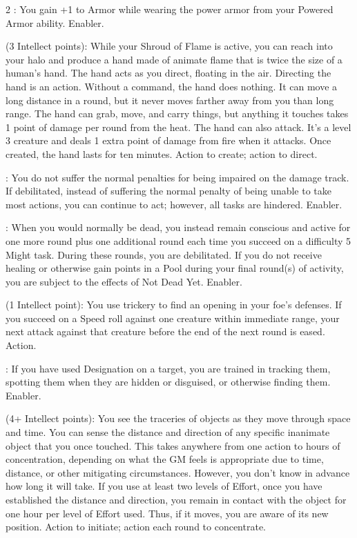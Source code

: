\begin{multicols}{2}
: You gain +1 to Armor while wearing the power armor from your Powered Armor ability. Enabler. 
 
 (3 Intellect points): While your Shroud of Flame is active, you can reach into your halo and produce a hand made of animate flame that is twice the size of a human’s hand. The hand acts as you direct, floating in the air. Directing the hand is an action. Without a command, the hand does nothing. It can move a long distance in a round, but it never moves farther away from you than long range. The hand can grab, move, and carry things, but anything it touches takes 1 point of damage per round from the heat. The hand can also attack. It’s a level 3 creature and deals 1 extra point of damage from fire when it attacks. Once created, the hand lasts for ten minutes. Action to create; action to direct. 
 
: You do not suffer the normal penalties for being impaired on the damage track. If debilitated, instead of suffering the normal penalty of being unable to take most actions, you can continue to act; however, all tasks are hindered. Enabler.
 
: When you would normally be dead, you instead remain conscious and active for one more round plus one additional round each time you succeed on a difficulty 5 Might task. During these rounds, you are debilitated. If you do not receive healing or otherwise gain points in a Pool during your final round(s) of activity, you are subject to the effects of Not Dead Yet. Enabler.
 
 (1 Intellect point): You use trickery to find an opening in your foe’s defenses. If you succeed on a Speed roll against one creature within immediate range, your next attack against that creature before the end of the next round is eased. Action. 
 
: If you have used Designation on a target, you are trained in tracking them, spotting them when they are hidden or disguised, or otherwise finding them. Enabler. 
 
 (4+ Intellect points): You see the traceries of objects as they move through space and time. You can sense the distance and direction of any specific inanimate object that you once touched. This takes anywhere from one action to hours of concentration, depending on what the GM feels is appropriate due to time, distance, or other mitigating circumstances. However, you don’t know in advance how long it will take. If you use at least two levels of Effort, once you have established the distance and direction, you remain in contact with the object for one hour per level of Effort used. Thus, if it moves, you are aware of its new position. Action to initiate; action each round to concentrate. 
 

\end{multicols}
